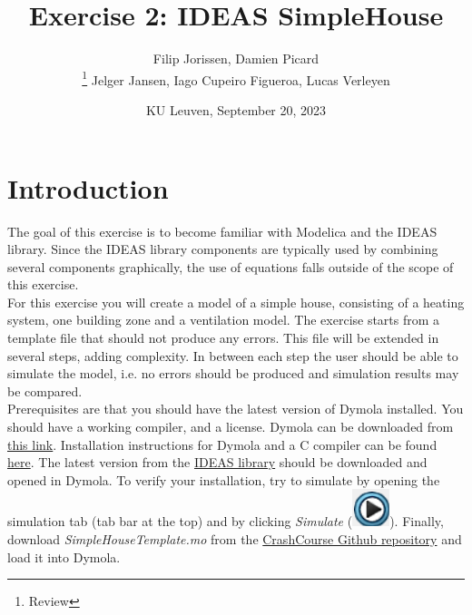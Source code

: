 \documentclass[10pt,a4paper]{article}
\begin{document}
\title{Exercise 2: IDEAS SimpleHouse}
\author{Filip Jorissen, Damien Picard\\ \thanks{Review} Jelger Jansen, Iago Cupeiro Figueroa, Lucas Verleyen}
\date{KU Leuven, September 20, 2023}
\maketitle

\doclicenseThis

\section*{Introduction}
The goal of this exercise is to become familiar with 
Modelica and the IDEAS library. 
Since the IDEAS library components are typically used
by combining several components graphically, the use of 
equations falls outside of the scope of this exercise.\\

For this exercise you will create a model of a simple house,
consisting of a heating system, one building zone 
and a ventilation model. 
The exercise starts from a template file that should 
not produce any errors. This file will be extended in
several steps, adding complexity.
In between each step the user should be able to simulate the
model, i.e. no errors should be produced and simulation results 
may be compared.\\

Prerequisites are that you should have the latest version of Dymola
installed. You should have a working compiler, and a license. 
Dymola can be downloaded from 
\href{http://www.3ds.com/products-services/catia/products/dymola/trial-version/}{this link}. 
Installation instructions for Dymola and a C compiler can be found 
\href{http://www.3ds.com/fileadmin/PRODUCTS/CATIA/DYMOLA/PDF/Installation.pdf}{here}.
The latest version from the \href{https://github.com/open-ideas/IDEAS}{IDEAS library} should be downloaded and opened in Dymola. 
To verify your installation, try to simulate  by opening the simulation tab (tab bar at the top) and by clicking \textit{Simulate} (\includegraphics[scale=0.35]{simulate.png}). Finally, download 
\textit{SimpleHouseTemplate.mo} from the \href{https://github.com/open-ideas/__CrashCourse__/tree/master/Exercises/Exercise%202}{CrashCourse Github repository}
and load it into Dymola.\\
\end{document}
